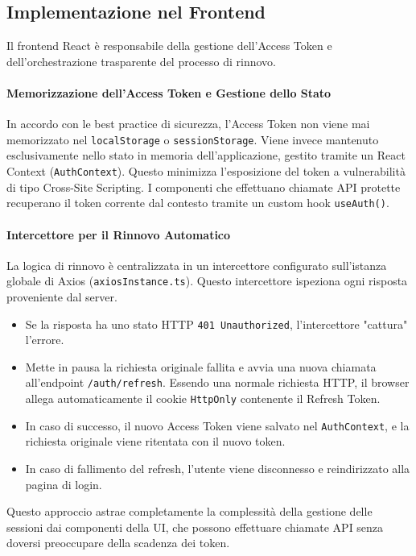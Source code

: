 \documentclass[12pt,a4paper,openright,twoside]{book}
\begin{document}
\subsection{Implementazione nel Frontend}
Il frontend React è responsabile della gestione dell'Access Token e dell'orchestrazione trasparente del processo di rinnovo.

\paragraph{Memorizzazione dell'Access Token e Gestione dello Stato}
In accordo con le best practice di sicurezza, l'Access Token non viene mai memorizzato nel \texttt{localStorage} o \texttt{sessionStorage}. Viene invece mantenuto esclusivamente nello stato in memoria dell'applicazione, gestito tramite un React Context (\texttt{AuthContext}). Questo minimizza l'esposizione del token a vulnerabilità di tipo Cross-Site Scripting. I componenti che effettuano chiamate API protette recuperano il token corrente dal contesto tramite un custom hook \texttt{useAuth()}.

\paragraph{Intercettore per il Rinnovo Automatico}
La logica di rinnovo è centralizzata in un intercettore configurato sull'istanza globale di Axios (\texttt{axiosInstance.ts}). Questo intercettore ispeziona ogni risposta proveniente dal server.
\begin{itemize}
    \item Se la risposta ha uno stato HTTP \texttt{401 Unauthorized}, l'intercettore "cattura" l'errore.
    \item Mette in pausa la richiesta originale fallita e avvia una nuova chiamata all'endpoint \texttt{/auth/refresh}. Essendo una normale richiesta HTTP, il browser allega automaticamente il cookie \texttt{HttpOnly} contenente il Refresh Token.
    \item In caso di successo, il nuovo Access Token viene salvato nel \texttt{AuthContext}, e la richiesta originale viene ritentata con il nuovo token.
    \item In caso di fallimento del refresh, l'utente viene disconnesso e reindirizzato alla pagina di login.
\end{itemize}
Questo approccio astrae completamente la complessità della gestione delle sessioni dai componenti della UI, che possono effettuare chiamate API senza doversi preoccupare della scadenza dei token.
\end{document}

